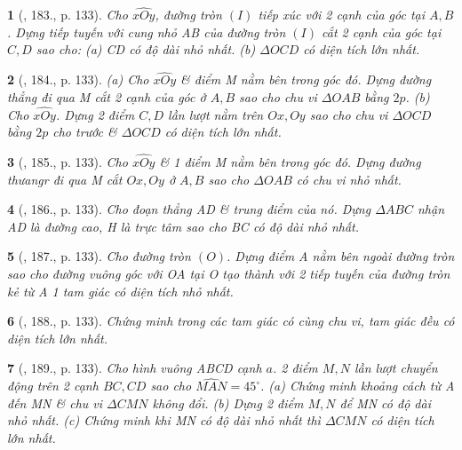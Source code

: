 \documentclass{article}
\newtheorem{baitoan}{}
\begin{document}
\begin{baitoan}[\cite{Binh_Toan_9_tap_1}, 183., p. 133]
	Cho $\widehat{xOy}$, đường tròn $(I)$ tiếp xúc với 2 cạnh của góc tại $A,B$. Dựng tiếp tuyến với cung nhỏ AB của đường tròn $(I)$ cắt 2 cạnh của góc tại $C,D$ sao cho: (a) CD có độ dài nhỏ nhất. (b) $\Delta OCD$ có diện tích lớn nhất.
\end{baitoan}

\begin{baitoan}[\cite{Binh_Toan_9_tap_1}, 184., p. 133]
	(a) Cho $\widehat{xOy}$ \& điểm M nằm bên trong góc đó. Dựng đường thẳng đi qua M cắt 2 cạnh của góc ở $A,B$ sao cho chu vi $\Delta OAB$ bằng $2p$. (b) Cho $\widehat{xOy}$. Dựng 2 điểm $C,D$ lần lượt nằm trên $Ox,Oy$ sao cho chu vi $\Delta OCD$ bằng $2p$ cho trước \& $\Delta OCD$ có diện tích lớn nhất.
\end{baitoan}

\begin{baitoan}[\cite{Binh_Toan_9_tap_1}, 185., p. 133]
	Cho $\widehat{xOy}$ \& 1 điểm M nằm bên trong góc đó. Dựng đường thưangr đi qua M cắt $Ox,Oy$ ở $A,B$ sao cho $\Delta OAB$ có chu vi nhỏ nhất.
\end{baitoan}

\begin{baitoan}[\cite{Binh_Toan_9_tap_1}, 186., p. 133]
	Cho đoạn thẳng AD \& trung điểm của nó. Dựng $\Delta ABC$ nhận AD là đường cao, H là trực tâm sao cho BC có độ dài nhỏ nhất.
\end{baitoan}

\begin{baitoan}[\cite{Binh_Toan_9_tap_1}, 187., p. 133]
	Cho đường tròn $(O)$. Dựng điểm A nằm bên ngoài đường tròn sao cho đường vuông góc với OA tại O tạo thành với 2 tiếp tuyến của đường tròn kẻ từ A 1 tam giác có diện tích nhỏ nhất.
\end{baitoan}

\begin{baitoan}[\cite{Binh_Toan_9_tap_1}, 188., p. 133]
	Chứng minh trong các tam giác có cùng chu vi, tam giác đều có diện tích lớn nhất.
\end{baitoan}

\begin{baitoan}[\cite{Binh_Toan_9_tap_1}, 189., p. 133]
	Cho hình vuông ABCD cạnh $a$. 2 điểm $M,N$ lần lượt chuyển động trên 2 cạnh $BC,CD$ sao cho $\widehat{MAN} = 45^\circ$. (a) Chứng minh khoảng cách từ A đến MN \& chu vi $\Delta CMN$ không đổi. (b) Dựng 2 điểm $M,N$ để MN có độ dài nhỏ nhất. (c) Chứng minh khi MN có độ dài nhỏ nhất thì $\Delta CMN$ có diện tích lớn nhất.
\end{baitoan}
\end{document}
